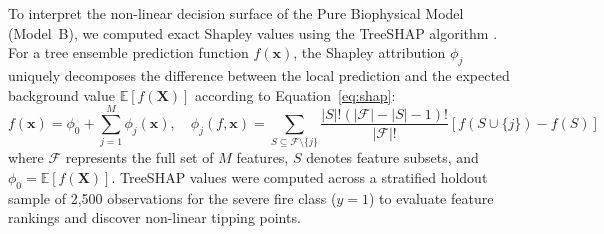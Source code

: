 To interpret the non-linear decision surface of the Pure Biophysical Model (Model~B), we computed exact Shapley values using the TreeSHAP algorithm \citep{LundbergLee2017NeurIPS}. For a tree ensemble prediction function $f(\mathbf{x})$, the Shapley attribution $\phi_j$ uniquely decomposes the difference between the local prediction and the expected background value $\mathbb{E}[f(\mathbf{X})]$ according to Equation~\eqref{eq:shap}:
\begin{equation}
f(\mathbf{x}) = \phi_0 + \sum_{j=1}^{M} \phi_j(\mathbf{x}), \quad \phi_j(f, \mathbf{x}) = \sum_{S \subseteq \mathcal{F} \setminus \{j\}} \frac{|S|!(|\mathcal{F}| - |S| - 1)!}{|\mathcal{F}|!} \left[ f(S \cup \{j\}) - f(S) \right]
\label{eq:shap}
\end{equation}
where $\mathcal{F}$ represents the full set of $M$ features, $S$ denotes feature subsets, and $\phi_0 = \mathbb{E}[f(\mathbf{X})]$. TreeSHAP values were computed across a stratified holdout sample of 2,500 observations for the severe fire class ($y=1$) to evaluate feature rankings and discover non-linear tipping points.
